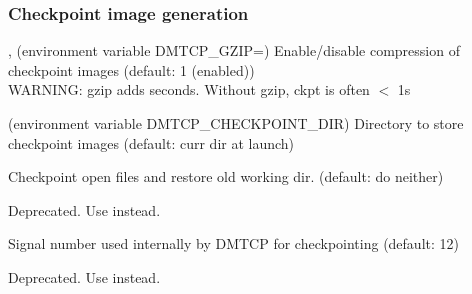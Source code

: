 \subsubsection{Checkpoint image generation}
\begin{Description}
  \item[\Opt{--gzip}, \Opt{--no-gzip} (environment variable DMTCP_GZIP=\Lbr01\Rbr)]
    Enable/disable compression of checkpoint images (default: 1 (enabled))\\
    WARNING:  gzip adds seconds.  Without gzip, ckpt is often $<$ 1s

  \item[\OptSArg{--ckptdir}{path} (environment variable DMTCP_CHECKPOINT_DIR)]
    Directory to store checkpoint images (default: curr dir at launch)

  \item[\Opt{--ckpt-open-files}]
    Checkpoint open files and restore old working dir. (default: do neither)

  \item[\Opt{--checkpoint-open-files}]
    Deprecated. Use  instead.

  \item[\OptSArg{--ckpt-signal}{signum}]
      Signal number used internally by DMTCP for checkpointing (default: 12)

  \item[\OptSArg{--ckpt-signal}{signum}]
    Deprecated. Use  instead.

\end{Description}

